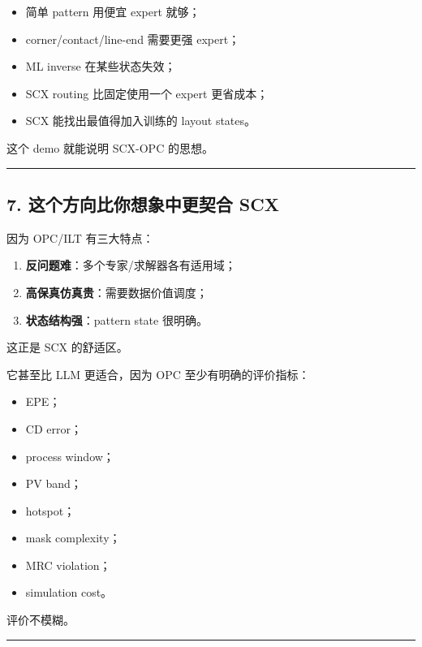 \documentclass[
  12pt,
]{ctexart}
\providecommand{\tightlist}{%
  \setlength{\itemsep}{0pt}\setlength{\parskip}{0pt}}
\begin{document}
\begin{itemize}
\tightlist
\item
  简单 pattern 用便宜 expert 就够；
\item
  corner/contact/line-end 需要更强 expert；
\item
  ML inverse 在某些状态失效；
\item
  SCX routing 比固定使用一个 expert 更省成本；
\item
  SCX 能找出最值得加入训练的 layout states。
\end{itemize}

这个 demo 就能说明 SCX-OPC 的思想。

\begin{center}\rule{0.5\linewidth}{0.5pt}\end{center}

\subsection{7. 这个方向比你想象中更契合
SCX}\label{ux8fd9ux4e2aux65b9ux5411ux6bd4ux4f60ux60f3ux8c61ux4e2dux66f4ux5951ux5408-scx}

因为 OPC/ILT 有三大特点：

\begin{enumerate}
\def\labelenumi{\arabic{enumi}.}
\tightlist
\item
  \textbf{反问题难}：多个专家/求解器各有适用域；
\item
  \textbf{高保真仿真贵}：需要数据价值调度；
\item
  \textbf{状态结构强}：pattern state 很明确。
\end{enumerate}

这正是 SCX 的舒适区。

它甚至比 LLM 更适合，因为 OPC 至少有明确的评价指标：

\begin{itemize}
\tightlist
\item
  EPE；
\item
  CD error；
\item
  process window；
\item
  PV band；
\item
  hotspot；
\item
  mask complexity；
\item
  MRC violation；
\item
  simulation cost。
\end{itemize}

评价不模糊。

\begin{center}\rule{0.5\linewidth}{0.5pt}\end{center}
\end{document}
